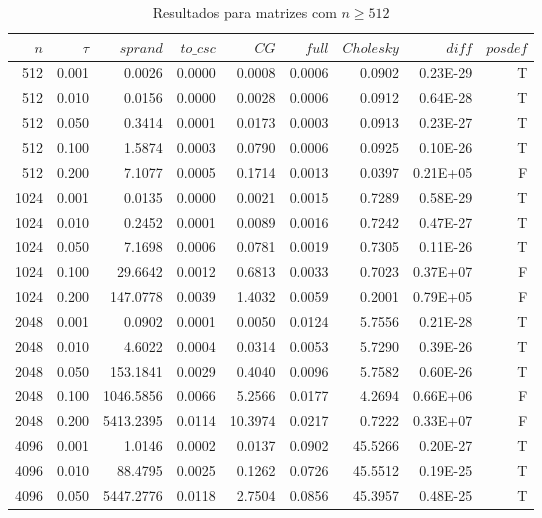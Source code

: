 \documentclass[a4paper,11pt]{article}
\begin{document}
      \begin{table}[h]
        \caption{Resultados para matrizes com $n \geq 512$}
        \centering
        \begin{tabular}{rrrrrrrrr}
            $n$ & $\tau$  & $sprand$ & $to\_csc$ & $CG$ & $full$ & $Cholesky$ & $diff$ & $posdef$\\
            \hline
            512 & 0.001 & 0.0026 & 0.0000 & 0.0008 & 0.0006 & 0.0902 & 0.23E-29 & T \\
            512 & 0.010 & 0.0156 & 0.0000 & 0.0028 & 0.0006 & 0.0912 & 0.64E-28 & T \\
            512 & 0.050 & 0.3414 & 0.0001 & 0.0173 & 0.0003 & 0.0913 & 0.23E-27 & T \\
            512 & 0.100 & 1.5874 & 0.0003 & 0.0790 & 0.0006 & 0.0925 & 0.10E-26 & T \\
            512 & 0.200 & 7.1077 & 0.0005 & 0.1714 & 0.0013 & 0.0397 & 0.21E+05 & F \\
            1024 & 0.001 & 0.0135 & 0.0000 & 0.0021 & 0.0015 & 0.7289 & 0.58E-29 & T \\
            1024 & 0.010 & 0.2452 & 0.0001 & 0.0089 & 0.0016 & 0.7242 & 0.47E-27 & T \\
            1024 & 0.050 & 7.1698 & 0.0006 & 0.0781 & 0.0019 & 0.7305 & 0.11E-26 & T \\
            1024 & 0.100 & 29.6642 & 0.0012 & 0.6813 & 0.0033 & 0.7023 & 0.37E+07 & F \\
            1024 & 0.200 & 147.0778 & 0.0039 & 1.4032 & 0.0059 & 0.2001 & 0.79E+05 & F \\
            2048 & 0.001 & 0.0902 & 0.0001 & 0.0050 & 0.0124 & 5.7556 & 0.21E-28 & T \\
            2048 & 0.010 & 4.6022 & 0.0004 & 0.0314 & 0.0053 & 5.7290 & 0.39E-26 & T \\
            2048 & 0.050 & 153.1841 & 0.0029 & 0.4040 & 0.0096 & 5.7582 & 0.60E-26 & T \\
            2048 & 0.100 & 1046.5856 & 0.0066 & 5.2566 & 0.0177 & 4.2694 & 0.66E+06 & F \\
            2048 & 0.200 & 5413.2395 & 0.0114 & 10.3974 & 0.0217 & 0.7222 & 0.33E+07 & F \\
            4096 & 0.001 & 1.0146 & 0.0002 & 0.0137 & 0.0902 & 45.5266 & 0.20E-27 & T \\
            4096 & 0.010 & 88.4795 & 0.0025 & 0.1262 & 0.0726 & 45.5512 & 0.19E-25 & T \\
            4096 & 0.050 & 5447.2776 & 0.0118 & 2.7504 & 0.0856 & 45.3957 & 0.48E-25 & T \\
        \end{tabular}
      \end{table}
\end{document}
